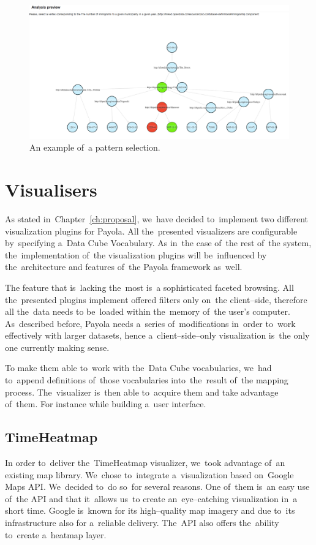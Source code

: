 \begin{figure}
	\centering
	\includegraphics[width=140mm]{img/pattern-selection.png}
	\caption{An example of~a pattern selection.}
	\label{fig:pattern-selection}
\end{figure}

\section{Visualisers}
As stated in~Chapter~\ref{ch:proposal}, we~have decided to~implement two 
different visualization plugins for Payola. All the~presented 
visualizers are configurable by~specifying a~Data Cube Vocabulary.
As in~the case of~the rest of~the 
system, the~implementation of~the visualization plugins will be~influenced 
by the~architecture and features of~the Payola framework as~well.

The feature that is~lacking the~most  is~a sophisticated faceted browsing. All the~presented plugins 
implement offered filters only on~the client--side, therefore all the~data needs 
to be~loaded within the~memory of~the user’s computer. As~described before, Payola 
needs a~series of~modifications in~order to~work effectively with larger 
datasets, hence a~client--side--only visualization is~the only one currently making sense.

To make them able to~work with the~Data Cube vocabularies, we~had to~append 
definitions of~those vocabularies into~the~result of~the mapping process. The~visualizer is~then able to~acquire them and take advantage of~them. For instance 
while building a~user interface.

\subsection{TimeHeatmap}
In order to~deliver the~TimeHeatmap visualizer, we~took advantage of~an existing 
map library. We~chose to~integrate a~visualization based on~Google Maps API. We~decided to~do so~for several reasons. One of~them is~an easy use of~the API and that it~allows us~to
create an~eye--catching visualization in~a short 
time. Google is~known for its high--quality map imagery and due to~its 
infrastructure also for a~reliable delivery. The~API also offers the~ability to~create a~heatmap layer.

